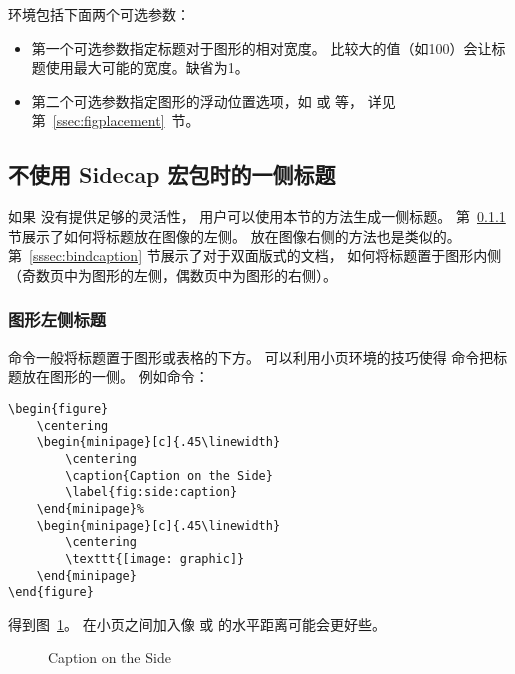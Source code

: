  环境包括下面两个可选参数：
\begin{itemize}
	\item 第一个可选参数指定标题对于图形的相对宽度。
	比较大的值（如100）会让标题使用最大可能的宽度。缺省为1。
	\item 第二个可选参数指定图形的浮动位置选项，如 \opt{[htp]}或 \opt{[!ht]} 等，
	详见第~\ref{ssec:figplacement}~节。
\end{itemize}

\subsection{不使用 Sidecap 宏包时的一侧标题}

如果  没有提供足够的灵活性，
用户可以使用本节的方法生成一侧标题。
第~\ref{sssec:leftcaption} 节展示了如何将标题放在图像的左侧。
放在图像右侧的方法也是类似的。
第~\ref{sssec:bindcaption} 节展示了对于双面版式的文档，
如何将标题置于图形内侧（奇数页中为图形的左侧，偶数页中为图形的右侧）。

\subsubsection{图形左侧标题}\label{sssec:leftcaption}

  命令一般将标题置于图形或表格的下方。
可以利用小页环境的技巧使得  命令把标题放在图形的一侧。
例如命令：
\begin{lstlisting}
\begin{figure}
	\centering
	\begin{minipage}[c]{.45\linewidth}
		\centering
		\caption{Caption on the Side}
		\label{fig:side:caption}
	\end{minipage}%
	\begin{minipage}[c]{.45\linewidth}
		\centering
		\texttt{[image: graphic]}
	\end{minipage}
\end{figure}
\end{lstlisting}
得到图~\ref{fig:side:caption}。
在小页之间加入像  或  的水平距离可能会更好些。

\begin{figure}
	\centering
	\begin{minipage}[c]{.45\linewidth}
		\centering
		\caption{Caption on the Side}
		\label{fig:side:caption}
	\end{minipage}%
	\begin{minipage}[c]{.45\linewidth}
		\centering
		\resizebox{\linewidth}{!}{\usebox{\boxgraphic}}
	\end{minipage}
\end{figure}


